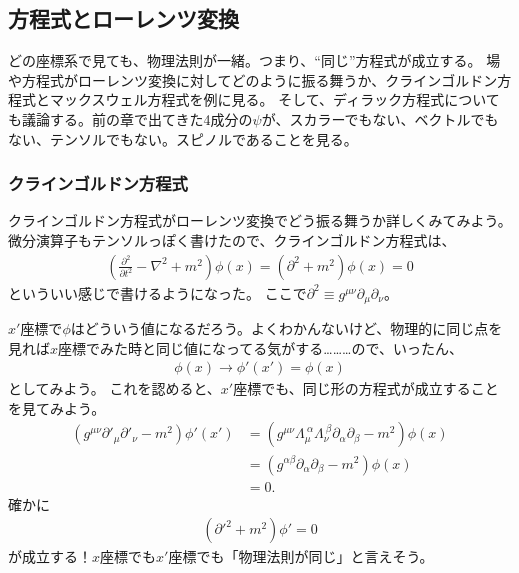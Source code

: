 \documentclass[10pt,a4paper]{jarticle}
\begin{document}
\subsection{方程式とローレンツ変換}
どの座標系で見ても、物理法則が一緒。つまり、``同じ''方程式が成立する。
場や方程式がローレンツ変換に対してどのように振る舞うか、クラインゴルドン方程式とマックスウェル方程式を例に見る。
そして、ディラック方程式についても議論する。前の章で出てきた4成分の$\psi$が、スカラーでもない、ベクトルでもない、テンソルでもない。スピノルであることを見る。


\subsubsection{クラインゴルドン方程式}
クラインゴルドン方程式がローレンツ変換でどう振る舞うか詳しくみてみよう。
微分演算子もテンソルっぽく書けたので、クラインゴルドン方程式は、
\begin{align}
\left( \frac{\partial^2}{\partial t^2} - \nabla^2 + m^2 \right) \phi(x) = (\partial^2 + m^2) \phi(x) = 0
\end{align}
といういい感じで書けるようになった。
ここで$\partial^2 \equiv g^{\mu\nu} \partial_\mu \partial_\nu$。

$x'$座標で$\phi$はどういう値になるだろう。よくわかんないけど、物理的に同じ点を見れば$x$座標でみた時と同じ値になってる気がする………ので、いったん、
\begin{align}
\phi(x) \to \phi'(x') = \phi(x)
\end{align}
としてみよう。
これを認めると、$x'$座標でも、同じ形の方程式が成立することを見てみよう。
\begin{align}
(g^{\mu\nu}\partial'_\mu \partial'_\nu - m^2) \phi'(x')
&= (g^{\mu\nu} \Lambda_{\mu}^{~\alpha} \Lambda_{\nu}^{~\beta} \partial_\alpha \partial_\beta - m^2) \phi(x) \nonumber\\
&= (g^{\alpha\beta} \partial_\alpha \partial_\beta - m^2) \phi(x) \nonumber\\
&= 0.
\end{align}
確かに
\begin{align}
({\partial'}^2 + m^2) \phi' = 0
\end{align}
が成立する！$x$座標でも$x'$座標でも「物理法則が同じ」と言えそう。

\end{document}
